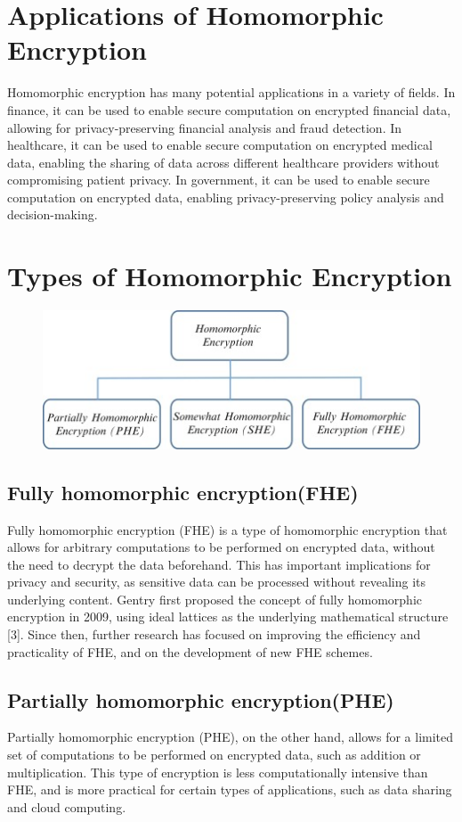 \documentclass[a4paper,11pt]{report}
\begin{document}
\section{Applications of Homomorphic Encryption}
Homomorphic encryption has many potential applications in a variety of fields. In finance, it can be used to enable secure computation on encrypted financial data, allowing for privacy-preserving financial analysis and fraud detection. In healthcare, it can be used to enable secure computation on encrypted medical data, enabling the sharing of data across different healthcare providers without compromising patient privacy. In government, it can be used to enable secure computation on encrypted data, enabling privacy-preserving policy analysis and decision-making.
\section{Types of Homomorphic Encryption}
\begin{figure}[h]
	\centering
	\hspace{21pt}
	\includegraphics[width=.70\linewidth]{type.jpg}
	\label{fig:type.png}
\end{figure}
\subsection{Fully homomorphic encryption(FHE)}
Fully homomorphic encryption (FHE) is a type of homomorphic encryption that allows for arbitrary computations to be performed on encrypted data, without the need to decrypt the data beforehand. This has important implications for privacy and security, as sensitive data can be processed without revealing its underlying content. Gentry first proposed the concept of fully homomorphic encryption in 2009, using ideal lattices as the underlying mathematical structure [3]. Since then, further research has focused on improving the efficiency and practicality of FHE, and on the development of new FHE schemes.
\subsection{Partially homomorphic encryption(PHE)}\label{AA}
Partially homomorphic encryption (PHE), on the other hand, allows for a limited set of computations to be performed on encrypted data, such as addition or multiplication. This type of encryption is less computationally intensive than FHE, and is more practical for certain types of applications, such as data sharing and cloud computing.
\end{document}
